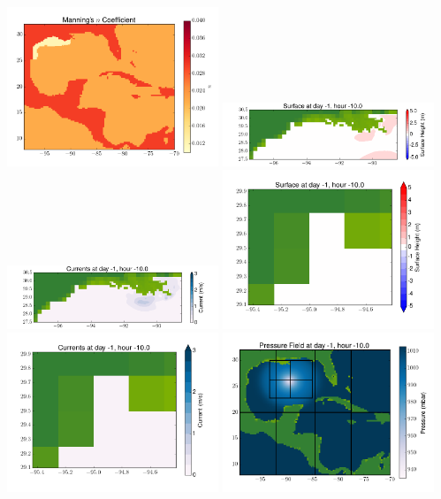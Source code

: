 \documentclass[11pt]{article}
\begin{document}
\vskip 10pt 
\includegraphics[width=0.475\textwidth]{frame0038fig3.png}
\includegraphics[width=0.475\textwidth]{frame0038fig4.png}
\vskip 10pt 
\includegraphics[width=0.475\textwidth]{frame0038fig5.png}
\includegraphics[width=0.475\textwidth]{frame0038fig6.png}
\vskip 10pt 
\includegraphics[width=0.475\textwidth]{frame0038fig7.png}
\includegraphics[width=0.475\textwidth]{frame0038fig8.png}
\end{document}
